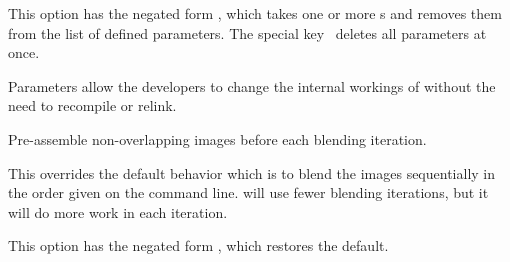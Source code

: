 \begin{codelist}
  This option has the negated form %
  , which takes one or more s and removes them from the list
  of defined parameters.  The special key~\sample{*} deletes all parameters at once.

  Parameters allow the developers to change the internal workings of \App{} without the need to
  recompile or relink.

\begin{sgquote}

\end{sgquote}


\ifenblend
    \label{opt:pre-assemble}%
  \item[\itempar{-a \\ --pre-assemble}]\itemend
    Pre-assemble non-overlapping images before each blending iteration.

    This overrides the default behavior which is to blend the images sequentially in the order
    given on the command line.  \App{} will use fewer blending iterations, but it will do more
    work in each iteration.

    This option has the negated form %
    , which restores the default.
\fi



\end{codelist}
